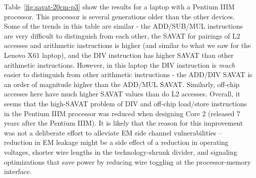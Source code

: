 Table~\ref{fig:savat-20cm-p3} show the results for a laptop with a Pentium IIIM processor. This processor is several generations older than the other devices. Some of the trends in this table are similar - the ADD/SUB/MUL instructions are very difficult to distinguish from each other, the SAVAT for pairings of L2 accesses and arithmetic instructions is higher (and similar to what we saw for the Lenovo X61 laptop), and the DIV instruction has higher SAVAT than other arithmetic instructions. However, in this laptop the DIV instruction is {\em much} easier to distinguish from other arithmetic instructions - the ADD/DIV SAVAT is an order of magnitude higher than the ADD/MUL SAVAT. Similarly, off-chip accesses here have much higher SAVAT values than do L2 accesses. Overall, it seems that the high-SAVAT problem of DIV and off-chip load/store instructions in the Pentium IIIM processor was reduced when designing Core 2 (released 7 years after the Pentium IIIM). It is likely that the reason for this improvement was not a deliberate effort to alleviate EM side channel vulnerabilities -- reduction in EM leakage might be a side effect of a reduction in operating voltages, shorter wire lengths in the technology-shrunk divider, and signaling optimizations that save power by reducing wire toggling at the processor-memory interface.
